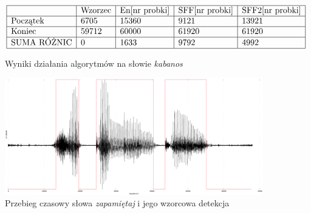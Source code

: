 \documentclass[eng,printmode]{mgr}
\begin{document}
	
	\begin{figure}
	 	\begin{center}
	 		$\begin{array}{ | l | l | l | l | l | }
	 			\hline
	 			& \textrm{Wzorzec}&\textrm{En[nr probki]} & \textrm{SFF[nr probki]} & \textrm{SFF2[nr probki]} \\ \hline
	 			\textrm{Początek} & 6705 & 15360 & 9121 & 13921  \\ \hline
	 			\textrm{Koniec} & 59712 & 60000 & 61920 & 61920  \\ \hline
	 			\textrm{SUMA RÓŻNIC} & 0 & 1633 & 9792 & 4992    \\ \hline
	 		\end{array}$
	 		\caption{Wyniki działania algorytmów na słowie \emph{kabanos}}\vspace{5mm}
	 	\end{center}
	 	
	 	\begin{center}
	 		\includegraphics[scale=0.2]{zapamietaj.png}
	 		\caption{Przebieg czasowy słowa \emph{zapamiętaj} i jego wzorcowa detekcja}\vspace{5mm}
	 	\end{center}
	\end{figure}
 
\end{document}
